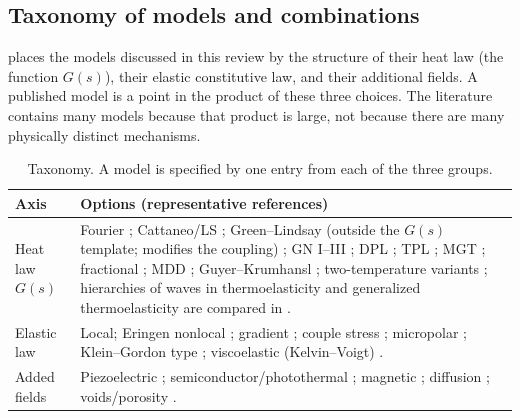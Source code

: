 \subsection{Taxonomy of models and combinations}
 places the models discussed in this review by the structure of their heat law (the function $G(s)$), their elastic constitutive law, and their additional fields. A published model is a point in the product of these three choices. The literature contains many models because that product is large, not because there are many physically distinct mechanisms.
\begin{table}[ht]\centering\small
\caption{Taxonomy. A model is specified by one entry from each of the three groups.}\label{tab:taxonomy}
\begin{tabularx}{\textwidth}{@{}p{2.6cm}X@{}}\toprule
Axis & Options (representative references)\\\midrule
Heat law $G(s)$ & Fourier \citep{Biot1956}; Cattaneo/LS \citep{Lord1967}; Green--Lindsay (outside the $G(s)$ template; modifies the coupling) \citep{Green1972}; GN I--III \citep{Green1991,Green1993}; DPL \citep{Tzou1995}; TPL \citep{RoyChoudhuri2007}; MGT \citep{Quintanilla2019}; fractional \citep{Povstenko2016}; MDD \citep{Wang2011}; Guyer--Krumhansl \citep{GuyerKrumhansl1966II}; two-temperature variants \citep{Youssef2006}; hierarchies of waves in thermoelasticity and generalized thermoelasticity are compared in \citep{Scott2007}.\\
Elastic law & Local; Eringen nonlocal \citep{Eringen1972,Eringen1974}; gradient \citep{Aifantis1992,Askes2011}; couple stress \citep{MindlinTiersten1962}; micropolar \citep{Eringen1999}; Klein--Gordon type \citep{Lazar2022}; viscoelastic (Kelvin--Voigt) \citep{Gupta2026HeatMap}.\\
Added fields & Piezoelectric \citep{Mindlin1974Thermopiezo}; semiconductor/photothermal \citep{Gupta2023}; magnetic \citep{Ezzat2011}; diffusion \citep{Abouelregal2020a}; voids/porosity \citep{Cowin1983,Iesan1986,Singh2020}.\\\bottomrule
\end{tabularx}
\end{table}

